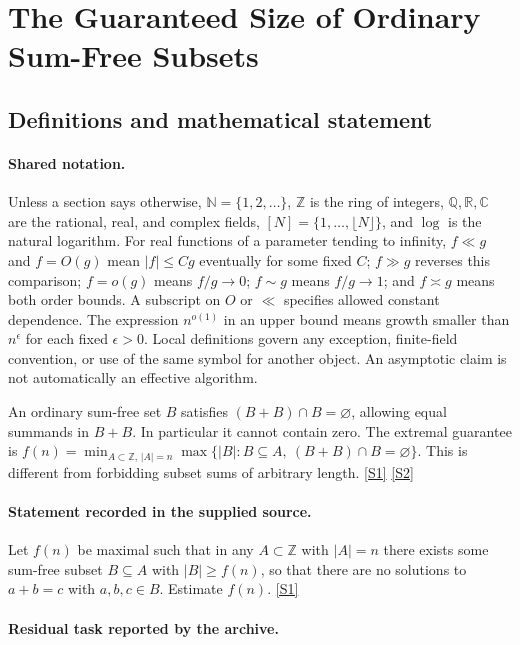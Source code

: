 \documentclass[11pt,a4paper]{article}
\newcommand{\N}{\mathbb{N}}
\newcommand{\Z}{\mathbb{Z}}
\newcommand{\Q}{\mathbb{Q}}
\newcommand{\R}{\mathbb{R}}
\newcommand{\C}{\mathbb{C}}
\newcommand{\sref}[2]{\hyperlink{source:#1:#2}{[S#2]}}
\begin{document}
\section{The Guaranteed Size of Ordinary Sum-Free Subsets}\label{statement}


\subsection{Definitions and mathematical statement}

\paragraph{Shared notation.}Unless a section says otherwise, $\N=\{1,2,\ldots\}$,
$\Z$ is the ring of integers, $\Q,\R,\C$ are the rational, real, and complex
fields, $[N]=\{1,\ldots,\lfloor N\rfloor\}$, and $\log$ is the natural
logarithm. For real functions of a parameter tending to infinity,
$f\ll g$ and $f=O(g)$ mean $|f|\leq Cg$ eventually for some fixed $C$;
$f\gg g$ reverses this comparison; $f=o(g)$ means $f/g\to0$;
$f\sim g$ means $f/g\to1$; and $f\asymp g$ means both order bounds.
A subscript on $O$ or $\ll$ specifies allowed constant dependence.
The expression $n^{o(1)}$ in an upper bound means growth smaller than
$n^\epsilon$ for each fixed $\epsilon>0$. Local definitions govern any
exception, finite-field convention, or use of the same symbol for another
object. An asymptotic claim is not automatically an effective algorithm.



An ordinary sum-free set $B$ satisfies $(B+B)\cap B=\varnothing$, allowing equal summands in $B+B$. In particular it cannot contain zero. The extremal guarantee is $f(n)=\min_{A\subset\Z,\,|A|=n}\max\{|B|:B\subseteq A,\ (B+B)\cap B=\varnothing\}$. This is different from forbidding subset sums of arbitrary length. \sref{statement}{1} \sref{statement}{2}

\paragraph{Statement recorded in the supplied source.}
Let $f(n)$ be maximal such that in any $A\subset \mathbb{Z}$ with $\lvert A\rvert=n$ there exists some sum-free subset $B\subseteq A$ with $\lvert B\rvert \geq f(n)$, so that there are no solutions to $ a+b=c $ with $a,b,c\in B$. Estimate $f(n)$. \sref{statement}{1}

\paragraph{Residual task reported by the archive.}
\end{document}
